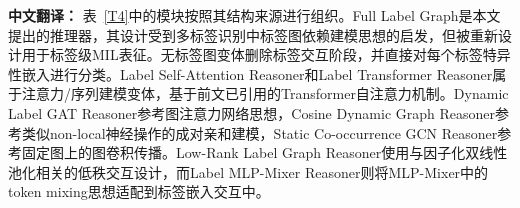 \documentclass[Afour,sagev,times]{sagej}
\begin{document}
\textbf{中文翻译：} 表~\ref{T4}中的模块按照其结构来源进行组织。Full Label Graph是本文提出的推理器，其设计受到多标签识别中标签图依赖建模思想的启发，但被重新设计用于标签级MIL表征。无标签图变体删除标签交互阶段，并直接对每个标签特异性嵌入进行分类。Label Self-Attention Reasoner和Label Transformer Reasoner属于注意力/序列建模变体，基于前文已引用的Transformer自注意力机制。Dynamic Label GAT Reasoner参考图注意力网络思想，Cosine Dynamic Graph Reasoner参考类似non-local神经操作的成对亲和建模，Static Co-occurrence GCN Reasoner参考固定图上的图卷积传播。Low-Rank Label Graph Reasoner使用与因子化双线性池化相关的低秩交互设计，而Label MLP-Mixer Reasoner则将MLP-Mixer中的token mixing思想适配到标签嵌入交互中。

\begin{table}[h]
\scriptsize\sf\centering
\caption{Module-effect ablation of label relation reasoners on the internal test set.\label{T4}}
\end{table}
\end{document}
